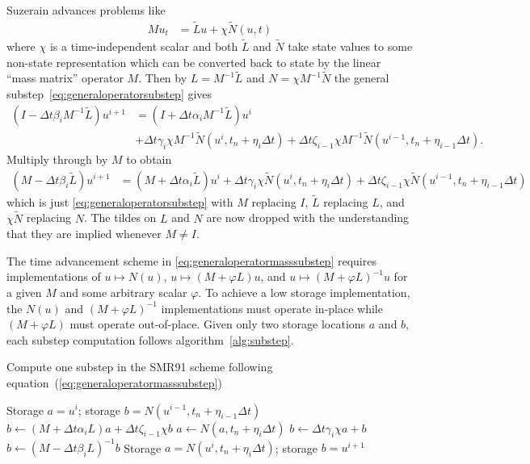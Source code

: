 \documentclass[letterpaper,11pt,nointlimits,reqno,draft]{amsbook}
\begin{document}
Suzerain advances problems like
\begin{align}
  \label{eq:timediscretization_mass_chi}
  Mu_{t}
  &=
  \tilde{L}u+\chi\tilde{N}\left( u,t \right)
\end{align}
where $\chi$ is a time-independent scalar and both $\tilde{L}$ and $\tilde{N}$
take state values to some non-state representation which can be converted back
to state by the linear ``mass matrix'' operator $M$.  Then by
$L=M^{-1}\tilde{L}$ and $N=\chi{}M^{-1}\tilde{N}$ the general
substep~\eqref{eq:generaloperatorsubstep} gives
\begin{align}
  \left(I - \Delta{}t\beta_{i}M^{-1}\tilde{L}\right) u^{i+1}
  &=
  \left(I + \Delta{}t\alpha_{i}M^{-1}\tilde{L}\right) u^{i}
\\
  &+ \Delta{}t\gamma_{i}\chi{}M^{-1}
    \tilde{N}\left(u^{i}, t_{n}+\eta_{i}\Delta{}t\right)
  + \Delta{}t\zeta_{i-1}\chi{}M^{-1}
    \tilde{N}\left(u^{i-1}, t_{n}+\eta_{i-1}\Delta{}t\right)
  .
\end{align}
Multiply through by $M$ to obtain
\begin{align}
  \left(M - \Delta{}t\beta_{i}\tilde{L}\right) u^{i+1}
  &=
  \left(M + \Delta{}t\alpha_{i}\tilde{L}\right) u^{i}
  + \Delta{}t\gamma_{i}\chi{}
    \tilde{N}\left(u^{i}, t_{n}+\eta_{i}\Delta{}t\right)
  + \Delta{}t\zeta_{i-1}\chi{}
    \tilde{N}\left(u^{i-1}, t_{n}+\eta_{i-1}\Delta{}t\right)
  \label{eq:generaloperatormasssubstep}
\end{align}
which is just \eqref{eq:generaloperatorsubstep} with $M$ replacing $I$,
$\tilde{L}$ replacing $L$, and $\chi{}\tilde{N}$ replacing $N$.  The tildes on
$L$ and $N$ are now dropped with the understanding that they are implied
whenever $M\neq{}I$.

The time advancement scheme in \eqref{eq:generaloperatormasssubstep} requires
implementations of $u\mapsto{}{N}\left(u\right)$,
$u\mapsto{}\left(M+\varphi{}L\right)u$, and
$u\mapsto{}\left(M+\varphi{}L\right)^{-1}u$ for a given $M$ and some arbitrary
scalar $\varphi$.  To achieve a low storage implementation, the
$N\left(u\right)$ and $\left(M+\varphi{}L\right)^{-1}$ implementations must
operate in-place while $\left(M+\varphi{}L\right)$ must operate out-of-place.
Given only two storage locations $a$ and $b$, each substep computation follows
algorithm~\vref{alg:substep}.

\begin{algorithm}
\label{alg:substep}
\caption{Compute one substep in the SMR91 scheme following
         equation~(\ref{eq:generaloperatormasssubstep})
         }
\begin{algorithmic}
  \REQUIRE Storage $a = u^i$;
           storage $b = N\left(u^{i-1},t_{n}+\eta_{i-1}\Delta{}t\right)$
  \STATE $b\leftarrow{}   \left(M+\Delta{}t\alpha_{i}L\right)a
                        + \Delta{}t\zeta_{i-1}\chi{}b$
  \STATE $a\leftarrow{}N\left(a,t_{n}+\eta_{i}\Delta{}t\right)$
  \STATE $b\leftarrow{}\Delta{}t\gamma_{i}\chi{}a + b$
  \STATE $b\leftarrow{}\left(M-\Delta{}t\beta_{i}L\right)^{-1}b$
  \ENSURE Storage $a = N\left(u^{i},t_{n}+\eta_{i}\Delta{}t\right)$;
          storage $b = u^{i+1}$
\end{algorithmic}
\end{algorithm}
\end{document}
